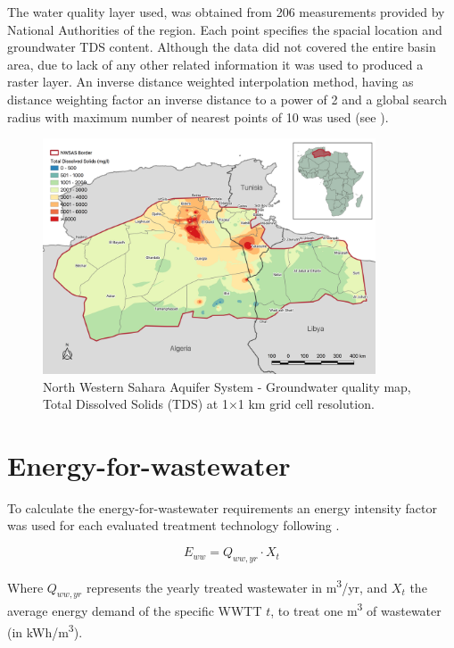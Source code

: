 \documentclass[12pt]{iopart}
\begin{document}
The water quality layer used, was obtained from 206 measurements provided by National Authorities of the region. Each point specifies the spacial location and groundwater TDS content. Although the data did not covered the entire basin area, due to lack of any other related information it was used to produced a raster layer. An inverse distance weighted interpolation method, having as distance weighting factor an inverse distance to a power of 2 and a global search radius with maximum number of nearest points of 10 was used (see ).

\begin{figure}[!h]
	\centering
	\includegraphics[width=0.88\textwidth, cfbox=black 1pt 0pt]{NWSAS_TDS}
	\caption[NWSAS groundwater quality map - Total Dissolved Solids (TDS)]{North Western Sahara Aquifer System - Groundwater quality map, Total Dissolved Solids (TDS) at 1$\times$1 km grid cell resolution.}
	\label{fig:TDS}
\end{figure}

\section{Energy-for-wastewater}\label{Sc:eww}
To calculate the energy-for-wastewater requirements an energy intensity factor was used for each evaluated treatment technology following .

\begin{equation}\label{eq:energy-for-wastewater}
E_{ww} = Q_{ww,yr}\cdot X_t
\end{equation}

Where $Q_{ww,yr}$ represents the yearly treated wastewater in m\textsuperscript{3}/yr, and $X_t$ the average energy demand of the specific WWTT $t$, to treat one m\textsuperscript{3} of wastewater (in kWh/m\textsuperscript{3}).

\newcommand{\newblock}{}


\end{document}
